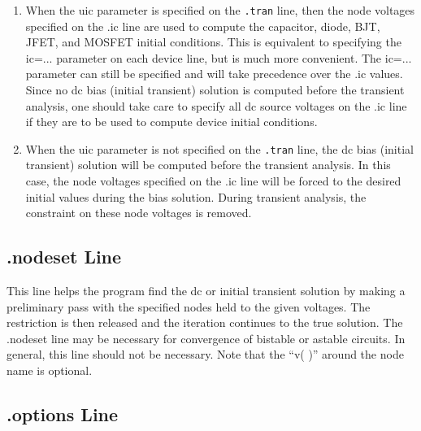 \begin{enumerate}
\item{ When the {\vt uic} parameter is specified on the {\tt .tran} line,
 then the node voltages specified on the {\vt .ic} line are used to
 compute the capacitor, diode, BJT, JFET, and MOSFET initial
 conditions.  This is equivalent to specifying the {\vt
 ic=}... parameter on each device line, but is much more convenient.
 The {\vt ic=}...  parameter can still be specified and will take
 precedence over the {\vt .ic} values.  Since no dc bias (initial
 transient) solution is computed before the transient analysis, one
 should take care to specify all dc source voltages on the {\vt .ic}
 line if they are to be used to compute device initial conditions. }

\item{ When the {\vt uic} parameter is not specified on the {\tt .tran}
 line, the dc bias (initial transient) solution will be computed
 before the transient analysis.  In this case, the node voltages
 specified on the {\vt .ic} line will be forced to the desired initial
 values during the bias solution.  During transient analysis, the
 constraint on these node voltages is removed. }
\end{enumerate}

\subsection{{\vt .nodeset} Line}

This line helps the program find the dc or initial transient solution
by making a preliminary pass with the specified nodes held to the
given voltages.  The restriction is then released and the iteration
continues to the true solution.  The {\vt .nodeset} line may be
necessary for convergence of bistable or astable circuits.  In
general, this line should not be necessary.  Note that the ``{\vt v(
)}'' around the node name is optional.

\subsection{{\vt .options} Line}

